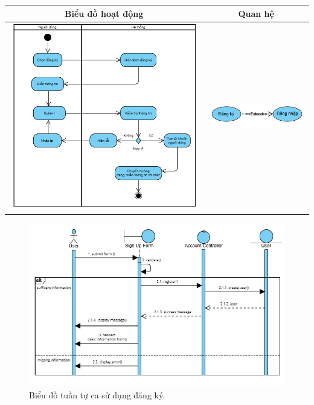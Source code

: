 \noindent 
\begin{tabular}{| c | c |}
    \hline
    \textbf{Biểu đồ hoạt động} & \textbf{Quan hệ} \\ 
    \hline
    \includegraphics[width=0.6\linewidth]{figures/c3/3-3-2-activity-diagram.png} 
    & 
    \includegraphics[width=0.35\linewidth]{figures/c3/3-3-2-relationship.png} \\ 
    \hline
\end{tabular}

\begin{figure}[H]
    \centering  
    \includegraphics[width=1\textwidth]{figures/c3/3-3-2-sequence-diagram.png}
    \caption{Biểu đồ tuần tự ca sử dụng đăng ký.}
    \label{fig:3-3-2-sequence-diagram}
\end{figure}
